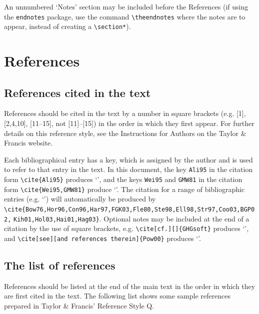 \documentclass[]{interact}
\theoremstyle{plain}%
\theoremstyle{definition}
\theoremstyle{remark}
\begin{document}
An unnumbered `Notes' section may be included before the References (if using the \verb"endnotes" package, use the command \verb"\theendnotes" where the notes are to appear, instead of creating a \verb"\section*").


\section{References}

\subsection{References cited in the text}

References should be cited in the text by a number in square brackets (e.g. [1], [2,4,10], [11--15], not [11]--[15]) in the order in which they first appear. For further details on this reference style, see the Instructions for Authors on the Taylor \& Francis website.

Each bibliographical entry has a key, which is assigned by the author and is used to refer to that entry in the text. In this document, the key \verb"Ali95" in the citation form \verb"\cite{Ali95}" produces `\cite{Ali95}', and the keys \verb"Wei95" and \verb"GMW81" in the citation form \verb"\cite{Wei95,GMW81}" produce `\cite{Wei95,GMW81}'. The citation for a range of bibliographic entries (e.g. `\cite{Bow76,Hor96,Con96,Har97,FGK03,Fle80,Ste98,Ell98,Str97,Coo03,BGP02,Kih01,Hol03,Hai01,Hag03}') will automatically be produced by \verb"\cite{Bow76,Hor96,Con96,Har97,FGK03,Fle80,Ste98,Ell98,Str97,Coo03,BGP02," \verb"Kih01,Hol03,Hai01,Hag03}". Optional notes may be included at the end of a citation by the use of square brackets, e.g. \verb"\cite[cf.][]{GHGsoft}" produces `\cite[cf.][]{GHGsoft}', and \verb"\cite[see][and references therein]{Pow00}" produces `\cite[see][and references therein]{Pow00}'.

\subsection{The list of references}

References should be listed at the end of the main text in the order in which they are first cited in the text. The following list shows some sample references prepared in Taylor \& Francis' Reference Style Q.
\end{document}
